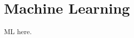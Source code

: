 \documentclass[Thesis.tex]{subfiles}
\begin{document}
\chapter{Machine Learning}

ML here.
\end{document}
